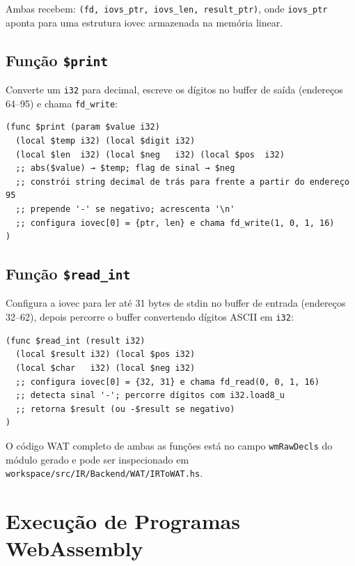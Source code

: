 Ambas recebem: \texttt{(fd, iovs\_ptr, iovs\_len, result\_ptr)}, onde
\texttt{iovs\_ptr} aponta para uma estrutura iovec armazenada na memória linear.

\subsection{Função \texttt{\$print}}

Converte um \texttt{i32} para decimal, escreve os dígitos no buffer de saída
(endereços 64–95) e chama \texttt{fd\_write}:

\begin{verbatim}
(func $print (param $value i32)
  (local $temp i32) (local $digit i32)
  (local $len  i32) (local $neg   i32) (local $pos  i32)
  ;; abs($value) → $temp; flag de sinal → $neg
  ;; constrói string decimal de trás para frente a partir do endereço 95
  ;; prepende '-' se negativo; acrescenta '\n'
  ;; configura iovec[0] = {ptr, len} e chama fd_write(1, 0, 1, 16)
)
\end{verbatim}

\subsection{Função \texttt{\$read\_int}}

Configura a iovec para ler até 31 bytes de stdin no buffer de entrada (endereços
32–62), depois percorre o buffer convertendo dígitos ASCII em \texttt{i32}:

\begin{verbatim}
(func $read_int (result i32)
  (local $result i32) (local $pos i32)
  (local $char   i32) (local $neg i32)
  ;; configura iovec[0] = {32, 31} e chama fd_read(0, 0, 1, 16)
  ;; detecta sinal '-'; percorre dígitos com i32.load8_u
  ;; retorna $result (ou -$result se negativo)
)
\end{verbatim}

O código WAT completo de ambas as funções está no campo \texttt{wmRawDecls} do
módulo gerado e pode ser inspecionado em
\texttt{workspace/src/IR/Backend/WAT/IRToWAT.hs}.

\section{Execução de Programas WebAssembly}\label{sec:wat-exec}

